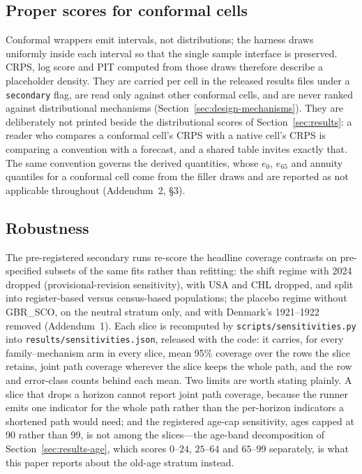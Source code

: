 \documentclass[11pt,a4paper]{article}
\theoremstyle{definition}
\begin{document}
\subsection{Proper scores for conformal cells}
Conformal wrappers emit intervals, not distributions; the harness draws
uniformly inside each interval so that the single sample interface is
preserved. CRPS, log score and PIT computed from those draws therefore
describe a placeholder density. They are carried per cell in the released
results files under a \texttt{secondary} flag, are read only against other
conformal cells, and are never ranked against distributional mechanisms
(Section~\ref{sec:design-mechanisms}). They are deliberately not printed
beside the distributional scores of Section~\ref{sec:results}: a reader who
compares a conformal cell's CRPS with a native cell's CRPS is comparing a
convention with a forecast, and a shared table invites exactly that. The
same convention governs the derived quantities, whose $e_0$, $e_{65}$ and
annuity quantiles for a conformal cell come from the filler draws and are
reported as not applicable throughout (Addendum~2, \S3).

\subsection{Robustness}
The pre-registered secondary runs re-score the headline coverage contrasts
on pre-specified subsets of the same fits rather than refitting: the shift
regime with 2024 dropped (provisional-revision sensitivity), with USA and
CHL dropped, and split into register-based versus census-based populations;
the placebo regime without GBR\_SCO, on the neutral stratum only, and with
Denmark's 1921--1922 removed (Addendum~1). Each slice is recomputed by
\texttt{scripts/sensitivities.py} into \texttt{results/sensitivities.json},
released with the code: it carries, for every family--mechanism arm in every
slice, mean 95\% coverage over the rows the slice retains, joint path
coverage wherever the slice keeps the whole path, and the row and
error-class counts behind each mean. Two limits are worth stating plainly.
A slice that drops a horizon cannot report joint path coverage, because the
runner emits one indicator for the whole path rather than the per-horizon
indicators a shortened path would need; and the registered age-cap
sensitivity, ages capped at 90 rather than 99, is not among the slices---the
age-band decomposition of Section~\ref{sec:results-age}, which scores
$0$--$24$, $25$--$64$ and $65$--$99$ separately, is what this paper reports
about the old-age stratum instead.





\end{document}
